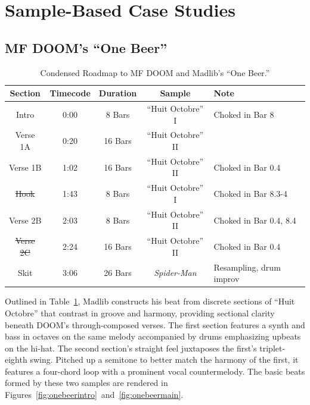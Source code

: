 \section{Sample-Based Case Studies}

\subsection*{\centering MF DOOM's ``One Beer''} 

    \begin{table}[ht]
        \centering
            \begin{tabular}{|c|c|c|c|l|}
                 \hline
                  Section         & Timecode & Duration & Sample              & Note                    \\ \hline
                  Intro           & 0:00     & 8 Bars   & ``Huit Octobre'' I  & Choked in Bar 8         \\ \hline
                  Verse 1A        & 0:20     & 16 Bars  & ``Huit Octobre'' II &                         \\ \hline
                  Verse 1B        & 1:02     & 16 Bars  & ``Huit Octobre'' II & Choked in Bar 0.4       \\ \hline
                  \sout{Hook}     & 1:43     & 8 Bars   & ``Huit Octobre'' I  & Choked in Bar 8.3-4     \\ \hline
                  Verse 2B        & 2:03     & 8 Bars   & ``Huit Octobre'' II & Choked in Bar 0.4, 8.4  \\ \hline
                  \sout{Verse 2C} & 2:24     & 16 Bars  & ``Huit Octobre'' II & Choked in Bar 0.4       \\ \hline
                  Skit            & 3:06     & 26 Bars  & \textit{Spider-Man} & Resampling, drum improv \\ \hline
             \end{tabular}
        \caption{Condensed Roadmap to MF DOOM and Madlib's ``One Beer.''}
        \label{tab:onebeer}
    \end{table}

\normalsize Outlined in Table~\ref{tab:onebeer}, Madlib constructs his beat from discrete sections of ``Huit Octobre'' that contrast in groove and harmony, providing sectional clarity beneath DOOM's through-composed verses. The first section features a synth and bass in octaves on the same melody accompanied by drums emphasizing upbeats on the hi-hat. The second section's straight feel juxtaposes the first's triplet-eighth swing. Pitched up a semitone to better match the harmony of the first, it features a four-chord loop with a prominent vocal countermelody. The basic beats formed by these two samples are rendered in Figures~\ref{fig:onebeerintro}~and~\ref{fig:onebeermain}.


